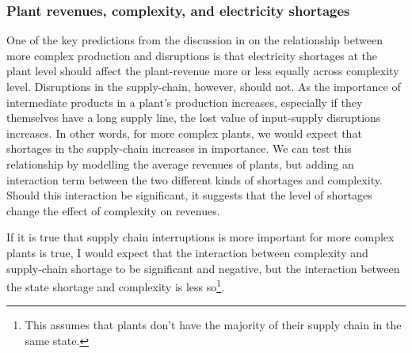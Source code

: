 \documentclass[11pt]{article}
\begin{document}
\subsubsection{Plant revenues, complexity, and electricity shortages}\label{sub:interaction_emp_strat}

One of the key predictions from the discussion in on the relationship between more complex production and disruptions is that electricity shortages at the plant level should affect the plant-revenue more or less equally across complexity level. Disruptions in the supply-chain, however, should not. As the importance of intermediate products in a plant's production increases, especially if they themselves have a long supply line, the lost value of input-supply disruptions increases. In other words, for more complex plants, we would expect that shortages in the supply-chain increases in importance. We can test this relationship by modelling the average revenues of plants, but adding an interaction term between the two different kinds of shortages and complexity. Should this interaction be significant, it suggests that the level of shortages change the effect of complexity on revenues.

 If it is true that supply chain interruptions is more important for more complex plants is true, I would expect that the interaction between complexity and supply-chain shortage to be significant and negative, but the interaction between the state shortage and complexity is less so\footnote{This assumes that plants don't have the majority of their supply chain in the same state.}. 
\end{document}
